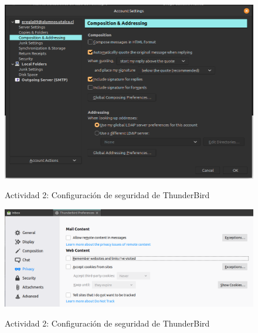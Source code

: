 \documentclass[11pt]{utalcaDoc}
\begin{document}
\begin{figure}[ht]
	\centering
	\includegraphics[width=.6\textwidth]{images/seguridad2}\\
	\caption{Actividad 2: Configuración de seguridad de ThunderBird}
	\label{FIG:seguridad2}
\end{figure}

\begin{figure}[ht]
	\centering
	\includegraphics[width=.6\textwidth]{images/seguridad3}\\
	\caption{Actividad 2: Configuración de seguridad de ThunderBird}
	\label{FIG:seguridad3}
\end{figure}
\end{document}
